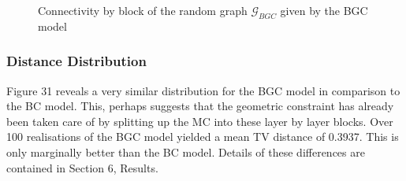 \begin{figure}[H]%
    \centering
    \captionsetup{justification=centering}
    \qquad
    \caption{Connectivity by block of the random graph $\mathcal{G}_{BGC}$ given by the BGC model}%
    \label{fig:example}%
\end{figure}

\subsubsection{Distance Distribution}

Figure 31 reveals a very similar distribution for the BGC model in comparison to the BC model. This, perhaps suggests that the geometric constraint has already been taken care of by splitting up the MC into these layer by layer blocks. Over 100 realisations of the BGC model yielded a mean TV distance of 0.3937. This is only marginally better than the BC model. Details of these differences are contained in Section 6, Results.

